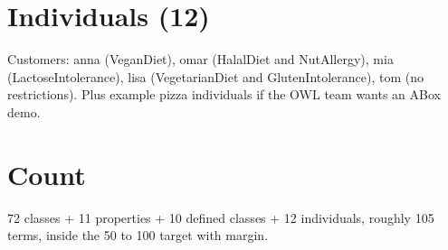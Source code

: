 \documentclass[11pt,a4paper]{article}
\begin{document}
\section{Individuals (12)}
Customers: anna (VeganDiet), omar (HalalDiet and NutAllergy), mia (LactoseIntolerance), lisa (VegetarianDiet and GlutenIntolerance), tom (no restrictions). Plus example pizza individuals if the OWL team wants an ABox demo.

\section{Count}
72 classes + 11 properties + 10 defined classes + 12 individuals, roughly 105 terms, inside the 50 to 100 target with margin.
\end{document}
